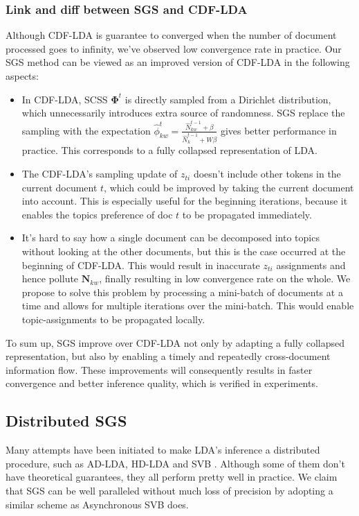 \documentclass{article} %
\begin{document}
\subsubsection{Link and diff between SGS and CDF-LDA}
Although CDF-LDA is guarantee to converged when the number of document processed goes to infinity, we've observed low convergence rate in practice. Our SGS method can be viewed as an improved version of CDF-LDA in the following aspects:
\begin{itemize}
\item In CDF-LDA, SCSS $\bm{\Phi}^t$ is directly sampled from a Dirichlet distribution, which unnecessarily introduces extra source of randomness. SGS replace the sampling with the expectation $\hat{\phi}_{kw}^t=\frac{\hat{N}_{kw}^{t-1}+\beta} {\hat{N}_k^{t-1}+W\beta}$ gives better performance in practice. This corresponds to a fully collapsed representation of LDA. 
\item The CDF-LDA's sampling update of $z_{ti}$ doesn't include other tokens in the current document $t$, which could be improved by taking the current document into account. This is especially useful for the beginning iterations, because it enables the topics preference of doc $t$ to be propagated immediately. 
\item It's hard to say how a single document can be decomposed into topics without looking at the other documents, but this is the case occurred at the beginning of CDF-LDA. This would result in inaccurate $z_{ti}$ assignments and hence pollute $\bm{N}_{kw}$, finally resulting in low convergence rate on the whole. We propose to solve this problem by processing a mini-batch of documents at a time and allows for multiple iterations over the mini-batch. This would enable topic-assignments to be propagated locally. 
\end{itemize}

To sum up, SGS improve over CDF-LDA not only by adapting a fully collapsed representation, but also by enabling a timely and repeatedly cross-document information flow. These improvements will consequently results in faster convergence and better inference quality, which is verified in experiments. 

\subsection{Distributed SGS}
Many attempts have been initiated to make LDA's inference a distributed procedure, such as AD-LDA, HD-LDA \cite{newman2007distributed} and SVB \cite{broderick2013streaming}. Although some of them don't have theoretical guarantees, they all perform pretty well in practice. We claim that SGS can be well paralleled without much loss of precision by adopting a similar scheme as Asynchronous SVB does. 
\end{document}
